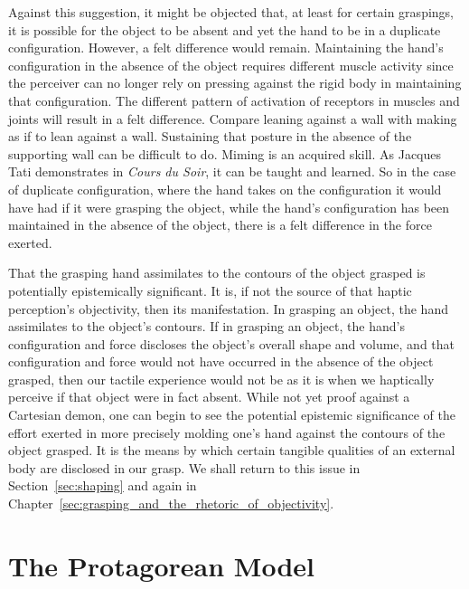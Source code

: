 Against this suggestion, it might be objected that, at least for certain graspings, it is possible for the object to be absent and yet the hand to be in a duplicate configuration. However, a felt difference would remain. Maintaining the hand's configuration in the absence of the object requires different muscle activity since the perceiver can no longer rely on pressing against the rigid body in maintaining that configuration. The different pattern of activation of receptors in muscles and joints will result in a felt difference. Compare leaning against a wall with making as if to lean against a wall. Sustaining that posture in the absence of the supporting wall can be difficult to do. Miming is an acquired skill. As Jacques Tati demonstrates in \emph{Cours du Soir}, it can be taught and learned. So in the case of duplicate configuration, where the hand takes on the configuration it would have had if it were grasping the object, while the hand's configuration has been maintained in the absence of the object, there is a felt difference in the force exerted.

That the grasping hand assimilates to the contours of the object grasped is potentially epistemically significant. It is, if not the source of that haptic perception's objectivity, then its manifestation. In grasping an object, the hand assimilates to the object's contours. If in grasping an object, the hand's configuration and force discloses the object's overall shape and volume, and that configuration and force would not have occurred in the absence of the object grasped, then our tactile experience would not be as it is when we haptically perceive if that object were in fact absent. While not yet proof against a Cartesian demon, one can begin to see the potential epistemic significance of the effort exerted in more precisely molding one's hand against the contours of the object grasped. It is the means by which certain tangible qualities of an external body are disclosed in our grasp. We shall return to this issue in Section~\ref{sec:shaping} and again in Chapter~\ref{sec:grasping_and_the_rhetoric_of_objectivity}.


\section{The Protagorean Model} %
\label{sec:the_protagorean_model}

